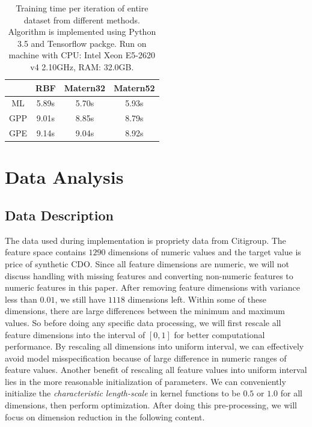 \documentclass[11pt,a4paper]{article}
\theoremstyle{definition}
\numberwithin{equation}{section}
\begin{document}
	\begin{table}
		\centering
		\begin{tabular}{c|ccc} 
			\toprule
			& RBF   & Matern32 & Matern52  \\ 
			\hline\hline
			ML  & 5.89s & 5.70s    & 5.93s     \\
			GPP & 9.01s & 8.85s    & 8.79s     \\
			GPE & 9.14s & 9.04s    & 8.92s     \\
			\bottomrule
		\end{tabular}
		\caption{Training time per iteration of entire dataset from different methods. Algorithm is implemented using Python 3.5 and Tensorflow packge. Run on machine with CPU: Intel Xeon E5-2620 v4 2.10GHz, RAM: 32.0GB.}
		\label{training_time}
	\end{table}
	
	
	\newpage
	\section{Data Analysis}\label{sec:data_analysis}
	
	\subsection{Data Description}
	The data used during implementation is propriety data from Citigroup. The feature space contains $1290$ dimensions of numeric values and the target value is price of synthetic CDO. Since all feature dimensions are numeric, we will not discuss handling with missing features and converting non-numeric features to numeric features in this paper. After removing feature dimensions with variance less than $0.01$\footnotemark[3], we still have $1118$ dimensions left. Within some of these dimensions, there are large differences between the minimum and maximum values. So before doing any specific data processing, we will first rescale all feature dimensions into the interval of $[0,1]$ for better computational performance. By rescaling all dimensions into uniform interval, we can effectively avoid model misspecification because of large difference in numeric ranges of feature values\cite{Kotsiantis}. Another benefit of rescaling all feature values into uniform interval lies in the more reasonable initialization of parameters. We can conveniently initialize the \textit{characteristic length-scale} in kernel functions to be $0.5$ or $1.0$ for all dimensions, then perform optimization. After doing this pre-processing, we will focus on dimension reduction in the following content.
	
\end{document}
